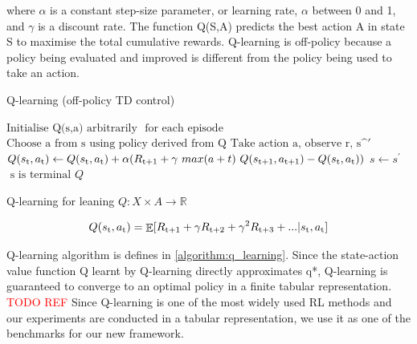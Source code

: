 \documentclass[11pt,twoside]{report}
\theoremstyle{plain}
\theoremstyle{definition}
\DeclareMathOperator{\E}{\mathbb{E}}
\begin{document}
where $\alpha$ is a constant step-size parameter, or learning rate, $\alpha$ between 0 and 1,  and $\gamma$ is a discount rate. 
The function Q(S,A) predicts the best action A in state S to maximise the total cumulative rewards. Q-learning is off-policy because a policy being evaluated and improved is different from the policy being used to take an action.

\begin{algorithm}
\caption{Q-learning (off-policy TD control)}
\label{algorithm:q_learning}
\begin{algorithmic}[1]
\Procedure{}{}
\State $\text{Initialise Q(s,a) arbitrarily}$
\Repeat$\text{\ for each episode}$
\State $\text{Choose a from s using policy derived from Q}$
\State $\text{Take action a, observe r,  s^$\prime$}$
\State $Q(s\textsubscript{t},a\textsubscript{t}) \leftarrow Q(s\textsubscript{t},a\textsubscript{t}) +  \alpha(R\textsubscript{t+1} + \gamma \ max (a+t) \ Q(s\textsubscript{t+1}, a\textsubscript{t+1}) - Q(s\textsubscript{t}, a\textsubscript{t}))$
\State $ s \leftarrow s^\prime $
\Until $\text{ s is terminal}$ 
\Return $Q$ 
\EndProcedure
\caption{Q-learning for leaning $Q: X \times A \rightarrow \mathbb{R} $}
\end{algorithmic}
\end{algorithm}

\begin{equation}
Q(s\textsubscript{t},a\textsubscript{t}) = \displaystyle \E [R\textsubscript{t+1} + \gamma R\textsubscript{t+2} + \gamma^2 R\textsubscript{t+3} + ... \vert s\textsubscript{t},a\textsubscript{t} ]
\end{equation}

Q-learning algorithm is defines in \ref{algorithm:q_learning}. Since the state-action value function Q learnt by Q-learning directly approximates q*, Q-learning is  guaranteed to converge to an optimal policy in a finite tabular representation. \textcolor{red}{TODO REF}
Since Q-learning is one of the most widely used RL methods and our experiments are conducted in a tabular representation, we use it as one of the benchmarks for our new framework.


\end{document}
